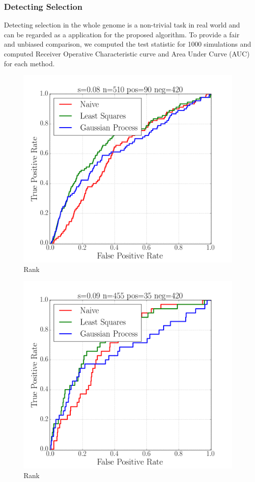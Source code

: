 \subsubsection{Detecting Selection}
Detecting selection in the whole genome is a non-trivial task in real world and can be regarded as a application for the proposed algorithm. To provide a fair and unbiased comparison, we computed the test statistic for 1000 simulations and computed Receiver Operative Characteristic curve and Area Under Curve (AUC) for each method.
\begin{figure}[H]
  \centering
    \includegraphics[width=\textwidth]{roc008}
  \caption{Rank}
  \label{fig:Fig3}
\end{figure}

\begin{figure}[H]
  \centering
    \includegraphics[width=\textwidth]{roc009}
  \caption{Rank}
  \label{fig:Fig3}
\end{figure}

